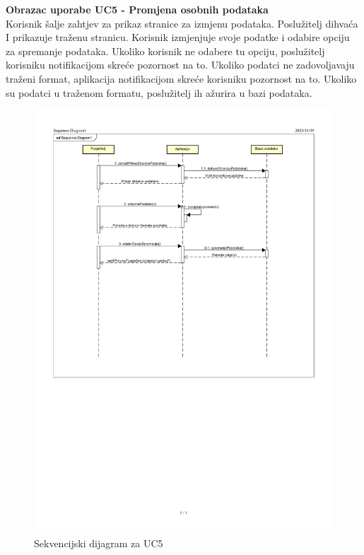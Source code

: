 				
				\eject
	
				
				
				\textbf{\large Obrazac uporabe UC5 - Promjena osobnih podataka}\\


				Korisnik šalje zahtjev za prikaz stranice za izmjenu podataka. Poslužitelj dihvaća I prikazuje traženu stranicu. Korisnik izmjenjuje svoje podatke i odabire opciju za spremanje podataka. Ukoliko korisnik ne odabere tu opciju, poslužitelj korisniku notifikacijom skreće pozornost na to. Ukoliko podatci ne zadovoljavaju traženi format, aplikacija notifikacijom skreće korisniku pozornost na to. Ukoliko su podatci u traženom formatu, poslužitelj ih ažurira u bazi podataka.
				\begin{figure}[H]
						\includegraphics[scale=0.7]{slike/sek_dijagram2-1.PNG} %
						\centering
						\caption{Sekvencijski dijagram za UC5}
						\label{fig:promjene}
				\end{figure}


